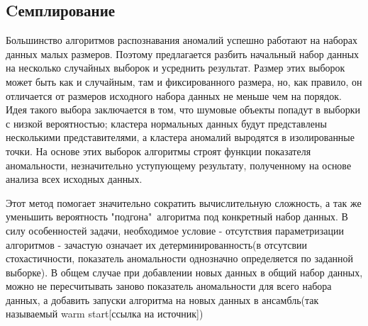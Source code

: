 \subsection*{Cемплирование}
Большинство алгоритмов распознавания аномалий успешно работают на наборах данных малых размеров. Поэтому предлагается разбить начальный набор данных на несколько случайных выборок и усреднить результат. Размер этих выборок может быть как и случайным, там и фиксированного размера, но, как правило, он отличается от размеров исходного набора данных не меньше чем на порядок. Идея такого выбора заключается в том, что шумовые объекты попадут в выборки с низкой вероятностью; кластера нормальных данных будут представлены несколькими представителями, а кластера аномалий выродятся в изолированные точки. На основе этих выборок алгоритмы строят функции показателя аномальности, незначительно уступующему результату, полученному на основе анализа всех исходных данных. 

Этот метод помогает значительно сократить вычислительную сложность, а так же уменьшить вероятность "подгона"\ алгоритма под конкретный набор данных.  В силу особенностей задачи, необходимое условие - отсутствия параметризации алгоритмов -  зачастую означает их детерминированность(в отсутсвии стохастичности, показатель аномальности однозначно определяется по  заданной выборке). В общем случае при добавлении новых данных в общий набор данных, можно не пересчитывать заново показатель аномальности для всего набора данных, а добавить запуски алгоритма на новых данных в ансамбль(так называемый warm start[ссылка на источник])
